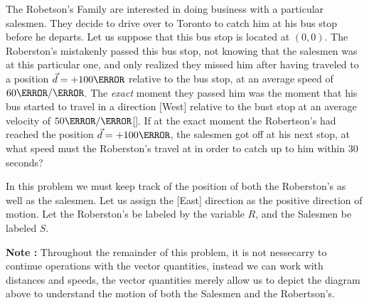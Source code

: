 \documentclass[12pt]{article} %
\newcommand{\tx}[1]{\text{#1}}
\begin{document}
\begin{qstn}[8]
    The Robetson's Family are interested in doing business with a particular salesmen. They decide to drive over to Toronto to catch him at his bus stop before he departs. Let us suppose that this bus stop is located at $(0,0)$. The Roberston's mistakenly passed this bus stop, not knowing that the salesmen was at this particular one, and only realized they missed him after having traveled to a position $\vec d = +100\m$ relative to the bus stop, at an average speed of $60 \m / \s$. The \emph{exact} moment they passed him was the moment that his bus started to travel in a direction [West] relative to the bust stop at an average velocity of $50 \m / \s $[\tx{West}]. If at the exact moment the Robertson's had reached the position $\vec d = +100\m$, the salesmen got off at his next stop, at what speed must the Roberston's travel at in order to catch up to him within $30$ seconds?


    \begin{soln}
        In this problem we must keep track of the position of both the Roberston's as well as the salesmen. Let us assign the [East] direction as the positive direction of motion. Let the Roberston's be labeled by the variable $R$, and the Salesmen be labeled $S$. 

        

    \begin{center}
    \end{center}

    \textbf{Note : }Throughout the remainder of this problem, it is not nessecarry to continue operations with the vector quantities, instead we can work with distances and speeds, the vector quantities merely allow us to depict the diagram above to understand the motion of both the Salesmen and the Robertson's.\\


\end{soln}
\end{qstn}
\end{document}
